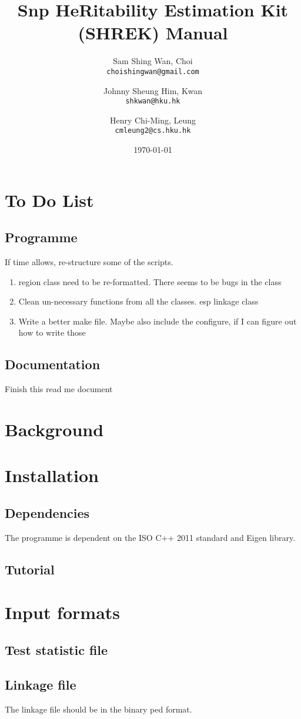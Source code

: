 \documentclass[12pt,a4paper,twoside]{report}
\title{Snp HeRitability Estimation Kit (SHREK) Manual}
\date{\today}
\author{Sam Shing Wan, Choi\\ 
\texttt{choishingwan@gmail.com}
\and
Johnny Sheung Him, Kwan\\
\texttt{shkwan@hku.hk}
\and
Henry Chi-Ming, Leung\\
\texttt{cmleung2@cs.hku.hk}
}
\begin{document}
\maketitle
\tableofcontents
\chapter{To Do List}
\section{Programme}
If time allows, re-structure some of the scripts.
\begin{enumerate}
\item{region class need to be re-formatted. There seems to be bugs in the class}
\item{Clean un-necessary functions from all the classes. esp linkage class}
\item{Write a better make file. Maybe also include the configure, if I can figure out how to write those}
\end{enumerate}
\section{Documentation}
Finish this read me document
\chapter{Background}
\chapter{Installation}
\section{Dependencies}
The programme is dependent on the ISO C++ 2011 standard and Eigen library.
\section{Tutorial}
\chapter{Input formats}
\section{Test statistic file}
\section{Linkage file}
The linkage file should be in the binary ped format. 
\end{document}
